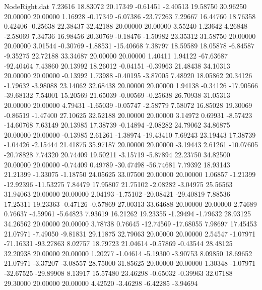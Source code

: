 \begin{filecontents}{NodeRight.dat}
   7.23616   18.83072   20.17349    -0.61451   -2.40513   19.58750   30.96250   20.00000   20.00000    1.16928   -0.17349   -6.07386  -23.77263
   7.29667   16.44760   18.76358     0.42406   -0.25638   22.38437   32.42188   20.00000   20.00000    3.55240    1.23642    4.26848   -2.58069
   7.34736   16.98456   20.30769    -0.18476   -1.50982   23.35312   31.58750   20.00000   20.00000    3.01544   -0.30769   -1.88531  -15.40668
   7.38797   18.59589   18.05878    -6.84587   -9.35275   22.72188   33.34687   20.00000   20.00000    1.40411    1.94122  -67.63687  -92.40464
   7.43860   20.13992   18.26012    -0.04151   -0.39963   21.48438   34.10313   20.00000   20.00000   -0.13992    1.73988   -0.40195   -3.87005
   7.48920   18.05862   20.34126    -1.79632   -3.98088   23.14062   32.68438   20.00000   20.00000    1.94138   -0.34126  -17.90566  -39.68132
   7.54001   15.20569   21.65039    -0.00569   -0.25638   26.70938   31.05313   20.00000   20.00000    4.79431   -1.65039   -0.05747   -2.58779
   7.58072   16.85028   19.30069    -0.86519   -1.47400   27.10625   32.52188   20.00000   20.00000    3.14972    0.69931   -8.57423  -14.60768
   7.63149   20.13985   17.38739    -0.14894   -2.08282   24.79062   34.86875   20.00000   20.00000   -0.13985    2.61261   -1.38974  -19.43410
   7.69243   23.19443   17.38739    -1.04426   -2.15444   21.41875   35.97187   20.00000   20.00000   -3.19443    2.61261  -10.07605  -20.78828
   7.74320   20.74409   19.50211    -3.15719   -5.87894   22.23750   34.82500   20.00000   20.00000   -0.74409    0.49789  -30.47498  -56.74681
   7.79392   18.93143   21.21399    -1.33075   -1.18750   24.05625   33.07500   20.00000   20.00000    1.06857   -1.21399  -12.92396  -11.53275
   7.84479   17.95807   21.75102    -2.08282   -3.04975   25.56563   31.94063   20.00000   20.00000    2.04193   -1.75102  -20.08421  -29.40819
   7.88536   17.25311   19.23363    -0.47126   -0.57869   27.00313   33.64688   20.00000   20.00000    2.74689    0.76637   -4.59961   -5.64823
   7.93619   16.21262   19.23355    -1.29494   -1.79632   28.93125   34.26562   20.00000   20.00000    3.78738    0.76645  -12.74569  -17.68055
   7.98697   17.45453   21.07971    -7.49050   -9.81831   29.11875   32.79063   20.00000   20.00000    2.54547   -1.07971  -71.16331  -93.27863
   8.02757   18.79723   21.04614    -0.57869   -0.43544   28.48125   32.20938   20.00000   20.00000    1.20277   -1.04614   -5.19300   -3.90753
   8.09850   18.69652   21.07971    -3.37207   -3.08557   28.75000   31.85625   20.00000   20.00000    1.30348   -1.07971  -32.67525  -29.89908
   8.13917   15.57480   23.46298    -0.65032   -0.39963   32.07188   29.30000   20.00000   20.00000    4.42520   -3.46298   -6.42285   -3.94694

\end{filecontents}
